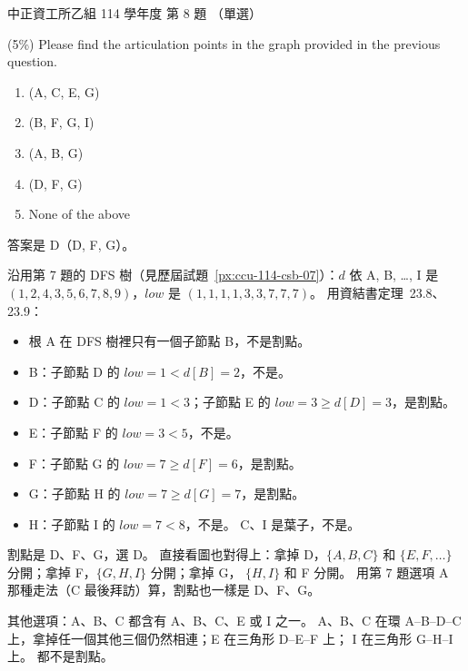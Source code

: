 \begin{pastexam}[label={px:ccu-114-csb-08}]{中正資工所乙組 114 學年度 第 8 題}
（單選）

(5\%) Please find the articulation points in the graph provided in the previous question.

\begin{center}
\end{center}
\begin{enumerate}[label=\Alph*.]
\item (A, C, E, G)
\item (B, F, G, I)
\item (A, B, G)
\item (D, F, G)
\item None of the above
\end{enumerate}
\end{pastexam}

\begin{pastsoln}
答案是 D（D, F, G）。

沿用第 7 題的 DFS 樹（見歷屆試題~\ref{px:ccu-114-csb-07}）：$d$ 依 A, B, \ldots, I 是 $(1, 2, 4, 3, 5, 6, 7, 8, 9)$，$\mathit{low}$ 是
$(1, 1, 1, 1, 3, 3, 7, 7, 7)$。 用資結書定理~23.8、23.9：
\begin{itemize}
\item 根 A 在 DFS 樹裡只有一個子節點 B，不是割點。
\item B：子節點 D 的 $\mathit{low} = 1 < d[B] = 2$，不是。
\item D：子節點 C 的 $\mathit{low} = 1 < 3$；子節點 E 的 $\mathit{low} = 3 \ge d[D] = 3$，是割點。
\item E：子節點 F 的 $\mathit{low} = 3 < 5$，不是。
\item F：子節點 G 的 $\mathit{low} = 7 \ge d[F] = 6$，是割點。
\item G：子節點 H 的 $\mathit{low} = 7 \ge d[G] = 7$，是割點。
\item H：子節點 I 的 $\mathit{low} = 7 < 8$，不是。 C、I 是葉子，不是。
\end{itemize}
割點是 D、F、G，選 D。 直接看圖也對得上：拿掉 D，$\{A, B, C\}$ 和 $\{E, F, \ldots\}$ 分開；拿掉 F，$\{G, H, I\}$ 分開；拿掉 G，
$\{H, I\}$ 和 F 分開。 用第 7 題選項 A 那種走法（C 最後拜訪）算，割點也一樣是 D、F、G。

其他選項：A、B、C 都含有 A、B、C、E 或 I 之一。 A、B、C 在環 A--B--D--C 上，拿掉任一個其他三個仍然相連；E 在三角形 D--E--F 上；
I 在三角形 G--H--I 上。 都不是割點。
\end{pastsoln}
